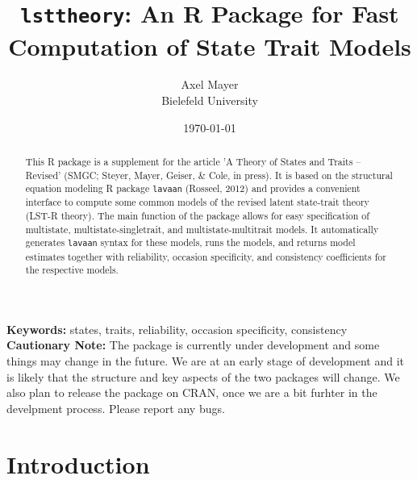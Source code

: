 \documentclass[10pt]{article}\usepackage[]{graphicx}\usepackage[]{xcolor}
\begin{document}



\title{\texttt{lsttheory}: An \textsf{R}  Package for Fast Computation of State Trait Models}

\author{
  Axel Mayer\\
  Bielefeld University
}

\date{\today}
\maketitle

\begin{abstract}
This \textsf{R} \cite{RCoreTeam} package is a supplement for the article 'A Theory of States and Traits -- Revised' (SMGC; Steyer, Mayer, Geiser, \& Cole, in press). It is based on the structural equation modeling \textsf{R} package \texttt{lavaan} (Rosseel, 2012) and provides a convenient interface to compute some common models of the revised latent state-trait theory (LST-R theory). The main function of the package allows for easy specification of multistate, multistate-singletrait, and multistate-multitrait models. It automatically generates \texttt{lavaan} syntax for these models, runs the models, and returns model estimates together with reliability, occasion specificity, and consistency coefficients for the respective models. 
\end{abstract}

\noindent
{\bf Keywords:} states, traits, reliability, occasion specificity, consistency \\


\textbf{Cautionary Note:} The package is currently under development and some things may change in the future. We are at an early stage of development and it is likely that the structure and key aspects of the two packages will change. We also plan to release the package on CRAN, once we are a bit furhter in the develpment process. Please report any bugs.




\newpage
\tableofcontents

\newpage



\section{Introduction} \label{sec:intro}
\end{document}
